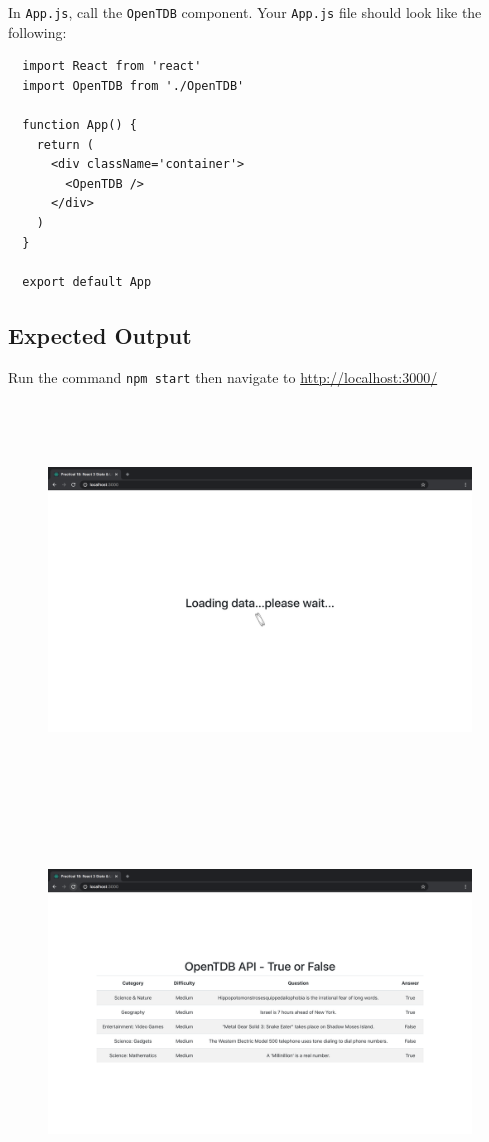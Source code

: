 \documentclass{article}
\begin{document}
In \texttt{App.js}, call the \texttt{OpenTDB} component. Your \texttt{App.js} file should look like the following:

\begin{verbatim}
  import React from 'react'
  import OpenTDB from './OpenTDB'
  
  function App() {
    return (
      <div className='container'>
        <OpenTDB />
      </div>
    )
  }  

  export default App
\end{verbatim}

\subsection*{Expected Output} 
Run the command \texttt{npm start} then navigate to \href{http://localhost:3000/}{http://localhost:3000/} \\

\begin{figure}[H]
  \includegraphics[width=175mm, height=105mm]{./img/18-expected-opentdb-1.png}
  \includegraphics[width=175mm, height=105mm]{./img/18-expected-opentdb-2.png}
\end{figure}
\end{document}

